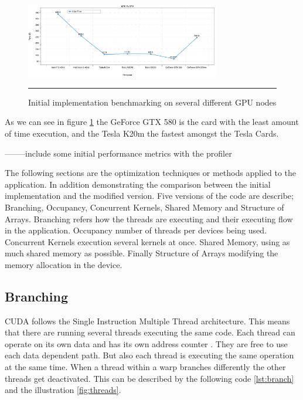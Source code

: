   \begin{figure}[htbp]
	\centering
		\includegraphics[width=0.76\textwidth]{Figures/gpu_initial.png}
		\rule{35em}{0.2pt}
	\caption[Initial GPU results]{Initial implementation benchmarking on several different GPU nodes}
	\label{fig:iniresults}
\end{figure}

As we can see in figure \ref{fig:iniresults} the GeForce GTX 580 is the card with the least amount of time execution, and the Tesla K20m the fastest amongst the Tesla Cards. 


--------include some initial performance metrics with the profiler

The following sections are the optimization techniques or methods applied to the application. In addition demonstrating the comparison between the initial implementation and the modified version. Five versions of the code are describe; Branching, Occupancy, Concurrent Kernels, Shared Memory and Structure of Arrays. Branching refers how the threads are executing and their executing flow in the application. Occupancy number of threads per devices being used. Concurrent Kernels execution several kernels at once. Shared Memory, using as much shared memory as possible. Finally Structure of Arrays modifying the memory allocation in the device.

 \subsection{Branching}
 
 CUDA follows the Single Instruction Multiple Thread architecture. This means that there are running several threads executing the same code. Each thread can operate on its own data and has its own address counter . They are free to use each data dependent path. But also each thread is executing the same operation at the same time. When a thread within a warp branches differently the other threads get deactivated\cite{hoermanngpu}. This can be described by the following code \ref{lst:branch} and the illustration \ref{fig:threads}.

